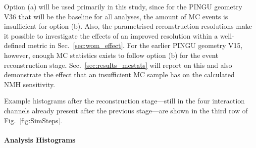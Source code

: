 Option (a) will be used primarily in this study, since for the PINGU geometry
V36 that will be the baseline for all analyses, the amount of MC events is
insufficient for option (b). Also, the parametrised reconstruction resolutions
make it possible to investigate the effects of an improved resolution within a
well-defined metric in Sec.~\ref{sec:wom_effect}.
For the earlier PINGU geometry V15, however, enough MC statistics exists to
follow option (b) for the event reconstruction stage.
Sec.~\ref{sec:results_mcstats} will report on this and also demonstrate the
effect that an insufficient MC sample has on the calculated NMH sensitivity.

Example histograms after the reconstruction stage---still in the four
interaction channels already present after the previous stage---are shown in
the third row of Fig.~\ref{fig:SimSteps}.

\paragraph{Analysis Histograms}



